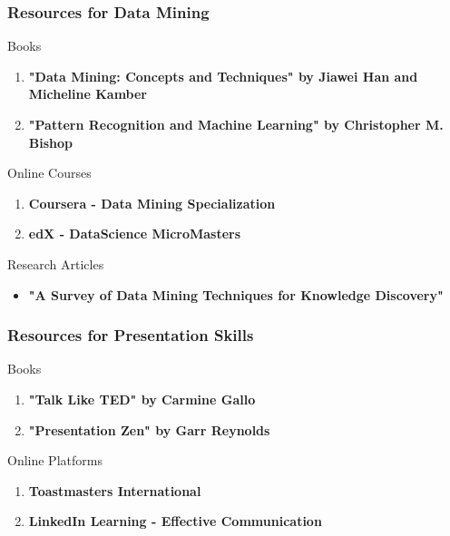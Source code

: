 \documentclass[aspectratio=169]{beamer}
\begin{document}
\begin{frame}[fragile]
    \frametitle{Resources for Data Mining}
    \begin{block}{Books}
        \begin{enumerate}
            \item \textbf{"Data Mining: Concepts and Techniques" by Jiawei Han and Micheline Kamber}
            \item \textbf{"Pattern Recognition and Machine Learning" by Christopher M. Bishop}
        \end{enumerate}
    \end{block}
    \begin{block}{Online Courses}
        \begin{enumerate}
            \item \textbf{Coursera - Data Mining Specialization}
            \item \textbf{edX - DataScience MicroMasters}
        \end{enumerate}
    \end{block}
    \begin{block}{Research Articles}
        \begin{itemize}
            \item \textbf{"A Survey of Data Mining Techniques for Knowledge Discovery"}
        \end{itemize}
    \end{block}
\end{frame}

\begin{frame}[fragile]
    \frametitle{Resources for Presentation Skills}
    \begin{block}{Books}
        \begin{enumerate}
            \item \textbf{"Talk Like TED" by Carmine Gallo}
            \item \textbf{"Presentation Zen" by Garr Reynolds}
        \end{enumerate}
    \end{block}
    \begin{block}{Online Platforms}
        \begin{enumerate}
            \item \textbf{Toastmasters International}
            \item \textbf{LinkedIn Learning - Effective Communication}
        \end{enumerate}
    \end{block}
\end{frame}
\end{document}
